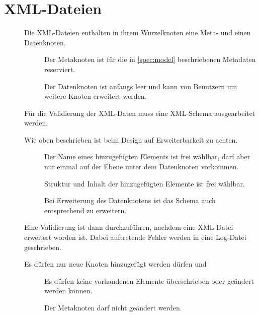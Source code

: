 \section{XML-Dateien} \label{spec:xml}
\begin{description}
	\item []
		Die XML-Dateien enthalten in ihrem Wurzelknoten eine Meta- und einen Datenknoten.
		\begin{description}
			\item []
				Der Metaknoten ist für die in \ref{spec:model} beschriebenen Metadaten reserviert.
			\item []
				Der Datenknoten ist anfangs leer und kann von Benutzern um weitere Knoten erweitert werden.
		\end{description}
	\item []
		Für die Validierung der XML-Daten muss eine XML-Schema ausgearbeitet werden.
	\item []
		Wie oben beschrieben ist beim Design auf Erweiterbarkeit zu achten.
		\begin{description}
			\item []
				Der Name eines hinzugefügten Elements ist frei wählbar, darf aber nur einmal
				auf der Ebene unter dem Datenknoten vorkommen.
			\item []
				Struktur und Inhalt der hinzugefügten Elemente ist frei wählbar.
			\item []
				Bei Erweiterung des Datenknotens ist das Schema auch entsprechend zu erweitern.
		\end{description}
	\item []
		Eine Validierung ist dann durchzuführen, nachdem eine XML-Datei erweitert worden ist.
		Dabei auftretende Fehler werden in eine Log-Datei geschrieben.
	\item []
		Es dürfen nur neue Knoten hinzugefügt werden dürfen und
		\begin{description}
			\item []
				Es dürfen keine vorhandenen Elemente überschrieben oder geändert werden können.
			\item []
				Der Metaknoten darf nicht geändert werden.
		\end{description}
\end{description}
	

